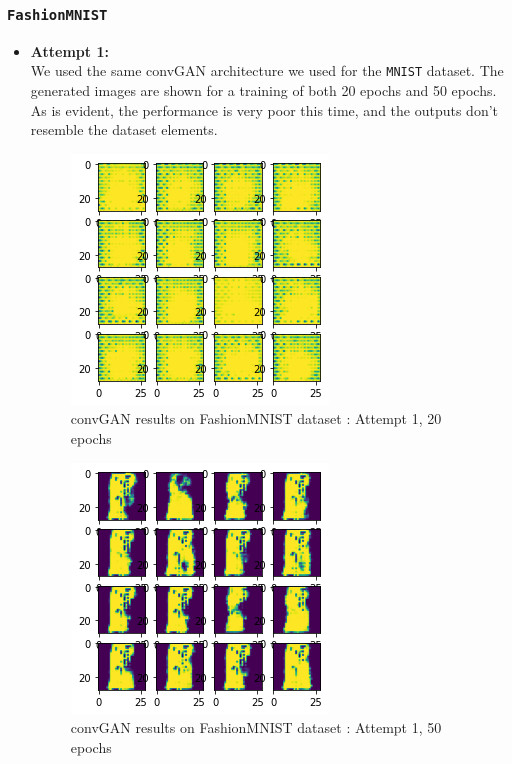 \documentclass[conference]{IEEEtran}
\begin{document}
\subsubsection{\texttt{FashionMNIST}}

\begin{itemize}
    \item \textbf{Attempt 1:}\\
    We used the same convGAN architecture we used for the \texttt{MNIST} dataset. The generated images are shown for a training of both 20 epochs and 50 epochs. As is evident, the performance is very poor this time, and the outputs don't resemble the dataset elements.
    
    \begin{figure}[h]
    \centering
    \includegraphics[scale = 0.5]{convGAN_FashionMNIST_20epoc (bad).png}
      \caption{convGAN results on FashionMNIST dataset : Attempt 1, 20 epochs}
    \end{figure}
    
    \begin{figure}[h]
    \centering
    \includegraphics[scale = 0.5]{convGAN_FashionMNIST_50epoc (bad).png}
      \caption{convGAN results on FashionMNIST dataset : Attempt 1, 50 epochs}
    \end{figure}
    

\end{itemize}
\end{document}

